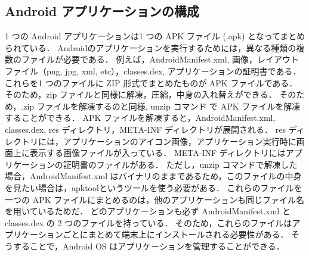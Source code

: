 \subsection{Android アプリケーションの構成}
\label{sec:andrapp}
1 つの Android アプリケーションは1 つの APK ファイル (.apk) となってまとめられている．
Androidのアプリケーションを実行するためには，異なる種類の複数のファイルが必要である．
例えば，AndroidManifest.xml, 画像，レイアウトファイル（png, jpg, xml, etc），classes.dex, アプリケーションの証明書である．
これらを1 つのファイルに ZIP 形式でまとめたものが APK ファイルである．
そのため，zip ファイルと同様に解凍，圧縮，中身の入れ替えができる．
そのため，.zip ファイルを解凍するのと同様, unzip コマンド で APK ファイルを解凍することができる．
APK ファイルを解凍すると，AndroidManifest.xml, classes.dex, res ディレクトリ，META-INF ディレクトリが展開される．
res ディレクトリには，アプリケーションのアイコン画像，アプリケーション実行時に画面上に表示する画像ファイルが入っている．
META-INF ディレクトリにはアプリケーションの証明書のファイルがある．
ただし，unzip コマンドで解凍した場合，AndroidManifest.xml はバイナリのままであるため，このファイルの中身を見たい場合は，apktool\cite{apktool}というツールを使う必要がある．
これらのファイルを一つの APK ファイルにまとめるのは，他のアプリケーションも同じファイル名を用いているためだ．
どのアプリケーションも必ず AndroidManifest.xml と classes.dex の 2 つのファイルを持っている．
そのため，これらのファイルはアプリケーションごとにまとめて端末上にインストールされる必要性がある．
そうすることで，Android OS はアプリケーションを管理することができる．

